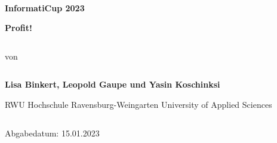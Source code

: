 
\begin{verbatim}
\end{verbatim}

\begin{verbatim}
	
\end{verbatim}
\begin{center}
	\textbf{InformatiCup 2023}
\end{center}
\begin{center}
	\large{\textbf{Profit!}}
\end{center}

\begin{verbatim}
\end{verbatim}
\begin{center}
	von
	\begin{verbatim}
	\end{verbatim}
	\large \textbf{Lisa Binkert, Leopold Gaupe und Yasin Koschinksi}
\end{center}
\begin{center}

	RWU Hochschule Ravensburg-Weingarten University of Applied Sciences
\end{center}

\begin{verbatim}
\end{verbatim}
\begin{center}
	Abgabedatum: 15.01.2023
\end{center}
\begin{verbatim}
	
	
	
\end{verbatim}	
